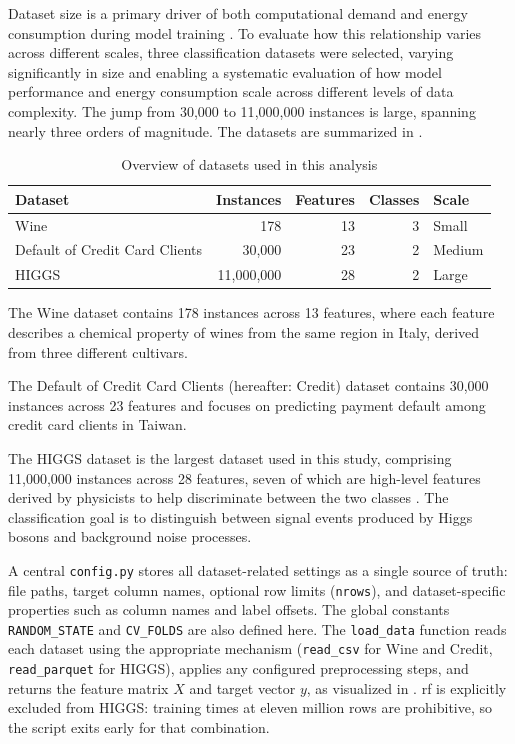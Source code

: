 Dataset size is a primary driver of both computational demand and energy consumption during model training \cite{rodriguezEvaluatingEnergyConsumption2024}. To evaluate how this relationship varies across different scales, three classification datasets were selected, varying significantly in size and enabling a systematic evaluation of how model performance and energy consumption scale across different levels of data complexity. The jump from 30{,}000 to 11{,}000{,}000 instances is large, spanning nearly three orders of magnitude. The datasets are summarized in .

\begin{table}[htbp]
\centering
\caption{Overview of datasets used in this analysis}
\label{tab:datasets}
\begin{tabular}{lrrrl}
\toprule
\textbf{Dataset} & \textbf{Instances} & \textbf{Features} & \textbf{Classes} & \textbf{Scale} \\
\midrule
Wine \cite{stefanaeberhardWine1992} & 178 & 13 & 3 & Small \\
Default of Credit Card Clients \cite{i-chengyehDefaultCreditCard2009} & 30{,}000 & 23 & 2 & Medium \\
HIGGS \cite{whitesonHIGGS2014} & 11{,}000{,}000 & 28 & 2 & Large \\
\bottomrule
\end{tabular}
\end{table}

The Wine \parencite{stefanaeberhardWine1992} dataset contains 178 instances across 13 features, where each feature describes a chemical property of wines from the same region in Italy, derived from three different cultivars.

The Default of Credit Card Clients \parencite{i-chengyehDefaultCreditCard2009} (hereafter: Credit) dataset contains 30{,}000 instances across 23 features and focuses on predicting payment default among credit card clients in Taiwan.

The HIGGS \parencite{whitesonHIGGS2014} dataset is the largest dataset used in this study, comprising 11{,}000{,}000 instances across 28 features, seven of which are high-level features derived by physicists to help discriminate between the two classes \cite{baldiSearchingExoticParticles2014}. The classification goal is to distinguish between signal events produced by Higgs bosons and background noise processes.

A central \texttt{config.py} stores all dataset-related settings as a single source of truth: file paths, target column names, optional row limits (\texttt{nrows}), and dataset-specific properties such as column names and label offsets. The global constants \texttt{RANDOM\_STATE} and \texttt{CV\_FOLDS} are also defined here. The \texttt{load\_data} function reads each dataset using the appropriate mechanism (\texttt{read\_csv} for Wine and Credit, \texttt{read\_parquet} for HIGGS), applies any configured preprocessing steps, and returns the feature matrix $X$ and target vector $y$, as visualized in . \gls{rf} is explicitly excluded from HIGGS: training times at eleven million rows are prohibitive, so the script exits early for that combination.


